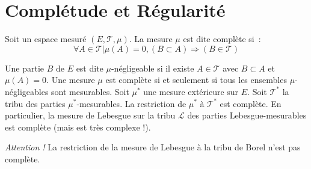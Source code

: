 \section{Complétude et Régularité}

 \begin{mandatory}
\begin{defn}
Soit un espace mesuré $(E, \mathcal{T}, \mu)$. La mesure $\mu$ est dite complète
si~:
\[
\forall A \in \mathcal{T} |
\mu(A) = 0, (B \subset A) \Rightarrow (B \in \mathcal{T})
\]
\end{defn}
\end{mandatory}
Une partie $B$ de $E$ est dite $\mu$-négligeable si il existe $A \in
\mathcal{T}$ avec $B \subset A$ et $\mu(A) = 0$. Une mesure $\mu$ est
complète si et seulement si tous les ensembles $\mu$-négligeables sont
mesurables. 
Soit $\mu^*$ une mesure extérieure sur $E$. Soit $\mathcal{T}^*$ la
tribu des parties $\mu^*$-mesurables. La restriction de
$\mu^*$ à  $\mathcal{T}^*$ est complète. 
En particulier, la mesure de Lebesgue sur la tribu $\mathcal{L}$ des parties
Lebesgue-mesurables est complète (mais est très complexe !).

{\em Attention !} La restriction de la mesure de Lebesgue à la tribu de Borel n'est pas
complète.

